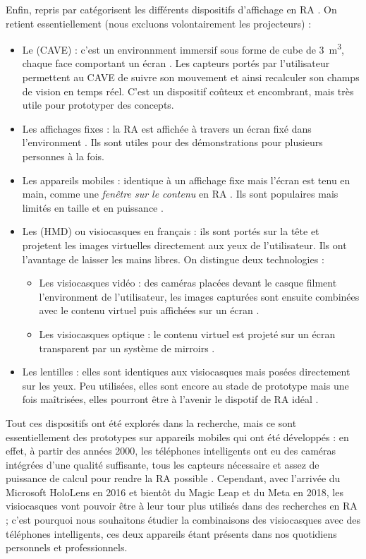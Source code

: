 Enfin, \cite{Buxton1998} repris par \cite{Bimber2005} catégorisent les différents dispositifs d'affichage en RA . On retient essentiellement (nous excluons volontairement les projecteurs) :
\begin{itemize}
  \item Le  (CAVE) : c'est un environnment immersif sous forme de cube de \SI{3}{\m^{3}}, chaque face comportant un écran . Les capteurs portés par l'utilisateur permettent au CAVE de suivre son mouvement et ainsi recalculer son champs de vision en temps réel. C'est un dispositif coûteux et encombrant, mais très utile pour prototyper des concepts.
  \item Les affichages fixes : la RA est affichée à travers un écran fixé dans l'environment . Ils sont utiles pour des démonstrations pour plusieurs personnes à la fois.
  \item Les appareils mobiles : identique à un affichage fixe mais l'écran est tenu en main, comme une \emph{fenêtre sur le contenu} en RA . Ils sont populaires mais limités en taille et en puissance \citep{Huang2013}.
  \item Les  (HMD) ou visiocasques en français : ils sont portés sur la tête et projetent les images virtuelles directement aux yeux de l'utilisateur. Ils ont l'avantage de laisser les mains libres. On distingue deux technologies :
  \begin{itemize}
    \item Les visiocasques vidéo : des caméras placées devant le casque filment l'environment de l'utilisateur, les images capturées sont ensuite combinées avec le contenu virtuel puis affichées sur un écran .
    \item Les visiocasques optique : le contenu virtuel est projeté sur un écran transparent par un système de mirroirs .
  \end{itemize}
  \item Les lentilles : elles sont identiques aux visiocasques mais posées directement sur les yeux. Peu utilisées, elles sont encore au stade de prototype mais une fois maîtrisées, elles pourront être à l'avenir le dispotif de RA idéal \citep{VanKrevelen2010}.
\end{itemize}

Tout ces dispositifs ont été explorés dans la recherche, mais ce sont essentiellement des prototypes sur appareils mobiles qui ont été développés : en effet, à partir des années 2000, les téléphones intelligents ont eu des caméras intégrées d'une qualité suffisante, tous les capteurs nécessaire et assez de puissance de calcul pour rendre la RA possible \citep{Huang2013}. Cependant, avec l'arrivée du Microsoft HoloLens en 2016 et bientôt du Magic Leap et du Meta en 2018, les visiocasques vont pouvoir être à leur tour plus utilisés dans des recherches en RA ; c'est pourquoi nous souhaitons étudier la combinaisons des visiocasques avec des téléphones intelligents, ces deux appareils  étant présents dans nos quotidiens personnels et professionnels.

